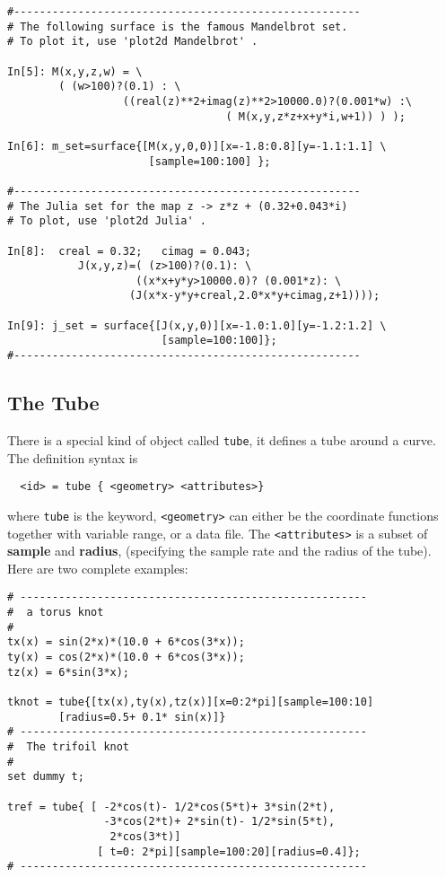 \begin{verbatim}
#------------------------------------------------------
# The following surface is the famous Mandelbrot set.
# To plot it, use 'plot2d Mandelbrot' .

In[5]: M(x,y,z,w) = \
        ( (w>100)?(0.1) : \
                  ((real(z)**2+imag(z)**2>10000.0)?(0.001*w) :\
                                  ( M(x,y,z*z+x+y*i,w+1)) ) );

In[6]: m_set=surface{[M(x,y,0,0)][x=-1.8:0.8][y=-1.1:1.1] \
                      [sample=100:100] };

#------------------------------------------------------
# The Julia set for the map z -> z*z + (0.32+0.043*i)
# To plot, use 'plot2d Julia' .  

In[8]:  creal = 0.32;   cimag = 0.043;
           J(x,y,z)=( (z>100)?(0.1): \
                    ((x*x+y*y>10000.0)? (0.001*z): \
                   (J(x*x-y*y+creal,2.0*x*y+cimag,z+1))));

In[9]: j_set = surface{[J(x,y,0)][x=-1.0:1.0][y=-1.2:1.2] \
                        [sample=100:100]};
#------------------------------------------------------
\end{verbatim}


\subsection{The Tube}
There is a special kind of object called \verb+tube+,
it defines a tube around a curve. The definition syntax
is
\begin{verbatim}
  <id> = tube { <geometry> <attributes>}
\end{verbatim}
where \verb+tube+ is the keyword, 
\verb+<geometry>+ can either be the coordinate functions
together with variable range, or a data file. The
\verb+<attributes>+ is a subset of
 {\bf sample} and {\bf radius}, (specifying the sample rate and
the radius of the tube). Here are two complete examples:
\begin{verbatim}
# ------------------------------------------------------
#  a torus knot
#
tx(x) = sin(2*x)*(10.0 + 6*cos(3*x));
ty(x) = cos(2*x)*(10.0 + 6*cos(3*x));
tz(x) = 6*sin(3*x);

tknot = tube{[tx(x),ty(x),tz(x)][x=0:2*pi][sample=100:10]
		[radius=0.5+ 0.1* sin(x)]}
# ------------------------------------------------------
#  The trifoil knot
#
set dummy t;

tref = tube{ [ -2*cos(t)- 1/2*cos(5*t)+ 3*sin(2*t),
               -3*cos(2*t)+ 2*sin(t)- 1/2*sin(5*t), 
                2*cos(3*t)]
              [ t=0: 2*pi][sample=100:20][radius=0.4]};
# ------------------------------------------------------
	

\end{verbatim}

